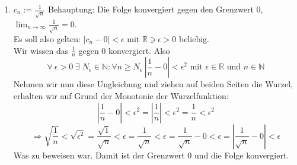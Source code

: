 \documentclass{article}
\begin{document}
\begin{enumerate}[ label= (\roman*) ]
        \item \(c_n := \frac{1}{\sqrt{n}} \)
        Behauptung: Die Folge konvergiert gegen den Grenzwert 0, \(\lim_{n \to \infty } \frac{1}{\sqrt{n}} = 0 \). \\
        Es soll also gelten: \( |c_n - 0| < \epsilon \) mit \( \mathbb{R} \ni \epsilon > 0\) beliebig. \\
        Wir wissen das \(\frac{1}{n}\) gegen 0 konvergiert. Also
        \[\forall \: \epsilon > 0 \; \exists \; N_{\epsilon} \in \mathbb{N} : \forall n \geq N_{\epsilon} \: |\frac{1}{n} - 0| < \epsilon^2
        \text{ mit } \epsilon \in \mathbb{R} \text{ und } n \in \mathbb{N}\]
        Nehmen wir nun diese Ungleichung und ziehen auf beiden Seiten die Wurzel, erhalten wir auf Grund der Monotonie der Wurzelfunktion:
        \[
            |\frac{1}{n} - 0| < \epsilon^2
            = |\frac{1}{n}| < \epsilon^2
            = \frac{1}{n} < \epsilon^2
        \]
        \[
            \Rightarrow \sqrt{ \frac{1}{n} }  < \sqrt{ \epsilon^2 }
            = \frac{ \sqrt{1} }{ \sqrt{n} }  < \epsilon
            = \frac{ 1 }{ \sqrt{n} }  < \epsilon
            = \frac{ 1 }{ \sqrt{n} } - 0 < \epsilon
            = | \frac{ 1 }{ \sqrt{n} } - 0 | < \epsilon
        \]
        Was zu beweisen war. Damit ist der Grenzwert 0 und die Folge konvergiert.


    \end{enumerate}
    
    
\end{document}
